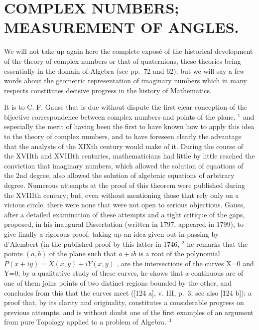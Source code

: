 \chapter{COMPLEX NUMBERS; MEASUREMENT OF ANGLES.}

We will not take up again here the complete exposé of the historical development of the theory of complex numbers or that of quaternions, these theories being essentially in the domain of Algebra (see pp.~72 and 62); but we will say a few words about the geometric representation of imaginary numbers which in many respects constitutes decisive progress in the history of Mathematics.

It is to C. F. Gauss that is due without dispute the first clear conception of the bijective correspondence between complex numbers and points of the plane, \(^{1}\) and especially the merit of having been the first to have known how to apply this idea to the theory of complex numbers, and to have foreseen clearly the advantage that the analysts of the XIXth century would make of it. During the course of the XVIIth and XVIIIth centuries, mathematicians had little by little reached the conviction that imaginary numbers, which allowed the solution of equations of the 2nd degree, also allowed the solution of algebraic equations of arbitrary degree. Numerous attempts at the proof of this theorem were published during the XVIIIth century; but, even without mentioning those that rely only on a vicious circle, there were none that were not open to serious objections. Gauss, after a detailed examination of these attempts and a tight critique of the gaps, proposed, in his inaugural Dissertation (written in 1797, appeared in 1799), to give finally a rigorous proof; taking up an idea given out in passing by d'Alembert (in the published proof by this latter in 1746, \(^{2}\) he remarks that the points \((a,b)\) of the plane such that \(a+ib\) is a root of the polynomial \(P(x+iy)=X(x,y)+iY(x,y)\) , are the intersections of the curves X=0 and Y=0; by a qualitative study of these curves, he shows that a continuous arc of one of them joins points of two distinct regions bounded by the other, and concludes from this that the curves meet ({[}124 a{]}, v. III, p.~3; see also {[}124 b{]}): a proof that, by its clarity and originality, constitutes a considerable progress on previous attempts, and is without doubt one of the first examples of an argument from pure Topology applied to a problem of Algebra. \(^{3}\)

